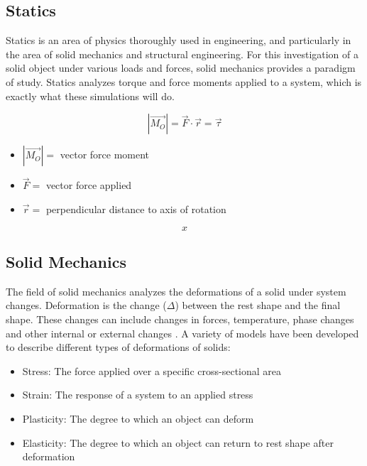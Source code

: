 \documentclass[12pt, letterpaper]{article}
\begin{document}
\subsection{Statics}
\label{sec:statics}

Statics is an area of physics thoroughly used in engineering, and particularly in the area of solid mechanics and structural engineering. For this investigation of a solid object under various loads and forces, solid mechanics provides a paradigm of study. Statics analyzes torque and force moments applied to a system, which is exactly what these simulations will do. 

\begin{singlespace}
\begin{equation}
	\label{eq:force}
	|\vec{M_O}| = \vec{F} \cdot \vec{r} = \vec{\tau}
\end{equation}
\begin{small}
	\begin{itemize}
	\item[] $|\vec{M_O}| =$ vector force moment
	\item[] $\vec{F} =$ vector force applied
	\item[] $\vec{r} =$ perpendicular distance to axis of rotation
	\end{itemize}
\end{small}
\begin{equation}
	\label{eq:torque}
	x
\end{equation}
\end{singlespace}

\subsection{Solid Mechanics}
\label{sec:solid-mechanics}

The field of solid mechanics analyzes the deformations of a solid under system changes. Deformation is the change ($\Delta$) between the rest shape and the final shape. These changes can include changes in forces, temperature, phase changes and other internal or external changes \autocite{chou_elasticity:_1992}. A variety of models have been developed to describe different types of deformations of solids:



\begin{itemize}
\item Stress: The force applied over a specific cross-sectional area
\item Strain: The response of a system to an applied stress
\item Plasticity: The degree to which an object can deform
\item Elasticity: The degree to which an object can return to rest shape after deformation
\end{itemize}
\end{document}
